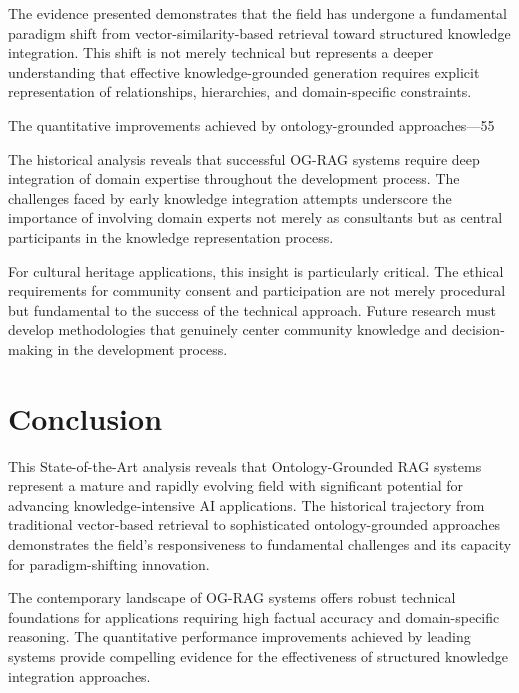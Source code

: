 \documentclass[12pt]{report}
\begin{document}
The evidence presented demonstrates that the field has undergone a fundamental paradigm shift from vector-similarity-based retrieval toward structured knowledge integration. This shift is not merely technical but represents a deeper understanding that effective knowledge-grounded generation requires explicit representation of relationships, hierarchies, and domain-specific constraints.

The quantitative improvements achieved by ontology-grounded approaches—55%

The historical analysis reveals that successful OG-RAG systems require deep integration of domain expertise throughout the development process. The challenges faced by early knowledge integration attempts underscore the importance of involving domain experts not merely as consultants but as central participants in the knowledge representation process.

For cultural heritage applications, this insight is particularly critical. The ethical requirements for community consent and participation are not merely procedural but fundamental to the success of the technical approach. Future research must develop methodologies that genuinely center community knowledge and decision-making in the development process.

\section{Conclusion}

This State-of-the-Art analysis reveals that Ontology-Grounded RAG systems represent a mature and rapidly evolving field with significant potential for advancing knowledge-intensive AI applications. The historical trajectory from traditional vector-based retrieval to sophisticated ontology-grounded approaches demonstrates the field's responsiveness to fundamental challenges and its capacity for paradigm-shifting innovation.

The contemporary landscape of OG-RAG systems offers robust technical foundations for applications requiring high factual accuracy and domain-specific reasoning. The quantitative performance improvements achieved by leading systems provide compelling evidence for the effectiveness of structured knowledge integration approaches.
\end{document}
